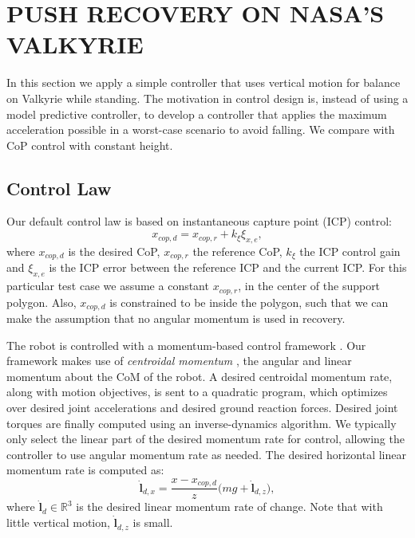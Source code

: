 \documentclass[letterpaper, 10 pt, conference]{ieeeconf}  %
\newcommand{\rcmpd}{x_{cop,d}}
\newcommand{\rcmpr}{x_{cop,r}}
\newcommand{\icpe}{\xi_{x,e}}
\begin{document}
\section{PUSH RECOVERY ON NASA'S VALKYRIE}\label{sec:valkyrie}
In this section we apply a simple controller that uses vertical motion for balance on Valkyrie while standing. The motivation in control design is, instead of using a model predictive controller, to develop a controller that applies the maximum acceleration possible in a worst-case scenario to avoid falling. We compare with CoP control with constant height.
\subsection{Control Law}
Our default control law is based on instantaneous capture point (ICP) \cite{koolen2012capturability} control:
\begin{equation}
	\rcmpd = \rcmpr + k_{\xi}\icpe,
\end{equation}
where $\rcmpd$ is the desired CoP, $\rcmpr$ the reference CoP, $k_{\xi}$ the ICP control gain and $\icpe$ is the ICP error between the reference ICP and the current ICP. For this particular test case we assume a constant $\rcmpr$, in the center of the support polygon. Also, $\rcmpd$ is constrained to be inside the polygon, such that we can make the assumption that no angular momentum is used in recovery.

The robot is controlled with a momentum-based control framework \cite{koolen2016design}. Our framework makes use of \textit{centroidal momentum} \cite{orin2013centroidal}, the angular and linear momentum about the CoM of the robot. 
A desired centroidal momentum rate, along with motion objectives, is sent to a quadratic program, which optimizes over desired joint accelerations and desired ground reaction forces. Desired joint torques are finally computed using an inverse-dynamics algorithm. We typically only select the linear part of the desired momentum rate for control, allowing the controller to use angular momentum rate as needed. The desired horizontal linear momentum rate is computed as:
\begin{equation}
	\dot{\mathbf{l}}_{d,x} = \frac{x-\rcmpd}{z}\big(mg + \dot{\mathbf{l}}_{d,z}\big),
\end{equation}
where $\dot{\mathbf{l}}_{d} \in \mathbb{R}^3$ is the desired linear momentum rate of change. Note that with little vertical motion, $ \dot{\mathbf{l}}_{d,z}$ is small.
\end{document}
